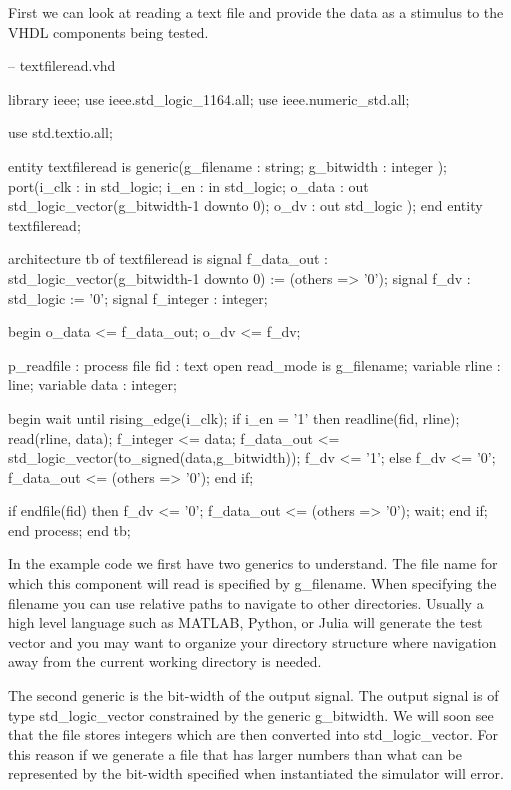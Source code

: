 First we can look at reading a text file and provide the data as a stimulus to the \ac{VHDL} components being tested. 

\begin{VHDLlisting}[tabsize=4]
-- textfileread.vhd

library	ieee;
	use ieee.std_logic_1164.all;
	use ieee.numeric_std.all;
	
	use std.textio.all;
	
entity textfileread is 
	generic(g_filename : string;
		    g_bitwidth : integer
	);
	port(i_clk    : in    std_logic;
	     i_en     : in    std_logic;
	     o_data   :   out std_logic_vector(g_bitwidth-1 downto 0);
		 o_dv     :   out std_logic	
	);
end entity textfileread;

architecture tb of textfileread is
	signal f_data_out : std_logic_vector(g_bitwidth-1 downto 0) := (others => '0');
	signal f_dv       : std_logic := '0';
	signal f_integer  : integer;
	
begin
	o_data <= f_data_out;
	o_dv <= f_dv;

	p_readfile : process
		file fid       : text open read_mode is g_filename;		
		variable rline : line;
		variable data  : integer;
		
	begin
		wait until rising_edge(i_clk);
		if i_en = '1' then
			readline(fid, rline);
			read(rline, data);
			f_integer <= data;
			f_data_out <= std_logic_vector(to_signed(data,g_bitwidth));
			f_dv <= '1';			
		else
			f_dv <= '0';
			f_data_out <= (others => '0');
		end if;
		
		if endfile(fid) then
			f_dv <= '0';
			f_data_out <= (others => '0');
			wait;
		end if;		
	end process;
end tb;
\end{VHDLlisting}

In the example code we first have two generics to understand. The file name for which this component will read is specified by g\_filename. When specifying the filename you can use relative paths to navigate to other directories. Usually a high level language such as MATLAB, Python, or Julia will generate the test vector and you may want to organize your directory structure where navigation away from the current working directory is needed. 

The second generic is the bit-width of the output signal. The output signal is of type std\_logic\_vector constrained by the generic g\_bitwidth. We will soon see that the file stores integers which are then converted into std\_logic\_vector. For this reason if we generate a file that has larger numbers than what can be represented by the bit-width specified when instantiated the simulator will error.

